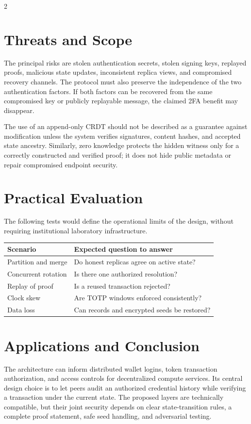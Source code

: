 \documentclass[10pt,letterpaper]{article}
\begin{document}
\begin{multicols}{2}
\section{Threats and Scope}
The principal risks are stolen authentication secrets, stolen signing keys, replayed proofs, malicious state updates, inconsistent replica views, and compromised recovery channels. The protocol must also preserve the independence of the two authentication factors. If both factors can be recovered from the same compromised key or publicly replayable message, the claimed 2FA benefit may disappear.

The use of an append-only CRDT should not be described as a guarantee against modification unless the system verifies signatures, content hashes, and accepted state ancestry. Similarly, zero knowledge protects the hidden witness only for a correctly constructed and verified proof; it does not hide public metadata or repair compromised endpoint security.

\section{Practical Evaluation}
The following tests would define the operational limits of the design, without requiring institutional laboratory infrastructure.

\begin{center}
\begin{minipage}{\columnwidth}
\centering\small
\begin{tabular}{p{}p{}}
\toprule
Scenario & Expected question to answer\\
\midrule
Partition and merge & Do honest replicas agree on active state?\\
Concurrent rotation & Is there one authorized resolution?\\
Replay of proof & Is a reused transaction rejected?\\
Clock skew & Are TOTP windows enforced consistently?\\
Data loss & Can records and encrypted seeds be restored?\\
\bottomrule
\end{tabular}
\end{minipage}
\end{center}

\section{Applications and Conclusion}
The architecture can inform distributed wallet logins, token transaction authorization, and access controls for decentralized compute services. Its central design choice is to let peers audit an authorized credential history while verifying a transaction under the current state. The proposed layers are technically compatible, but their joint security depends on clear state-transition rules, a complete proof statement, safe seed handling, and adversarial testing.

\end{multicols}
\end{document}
